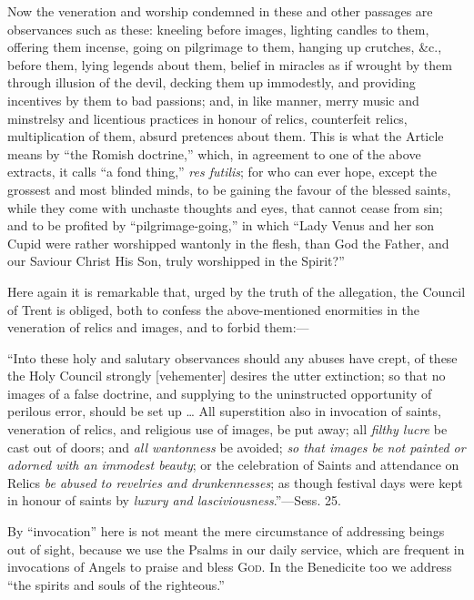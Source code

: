 Now the veneration and worship condemned in these and other
passages are observances such as these: kneeling before images,
lighting candles to them, offering them incense, going on pilgrimage
to them, hanging up crutches, \&c., before them, lying legends
about them, belief in miracles as if wrought by them through illusion
of the devil, decking them up immodestly, and providing incentives by
them to bad passions; and, in like manner, merry music and minstrelsy
and licentious practices in honour of relics, counterfeit relics,
multiplication of them, absurd pretences about them. This is what the
Article means by ``the Romish doctrine,'' which, in agreement
to one of the above extracts, it calls ``a fond thing,'' \emph{res
futilis}; for who can ever hope, except the grossest and most
blinded minds, to be gaining the favour of the blessed saints, while
they come with unchaste thoughts and eyes, that cannot cease from sin;
and to be profited by ``pilgrimage-going,'' in which
``Lady Venus and her son Cupid were rather worshipped wantonly in
the flesh, than God the Father, and our Saviour Christ His Son, truly
worshipped in the Spirit?''

Here again it is remarkable that, urged by the truth of the
allegation, the Council of Trent is obliged, both to confess the
above-mentioned enormities in the veneration of relics and images, and
to forbid them:—

``Into these holy and salutary observances
should any abuses have crept, of these the Holy Council strongly
[vehementer] desires the utter extinction; so that no images of a
false doctrine, and supplying to the uninstructed opportunity of
perilous error, should be set up … All superstition also in
invocation of saints, veneration of relics, and religious use of
images, be put away; all \emph{filthy lucre} be cast out of doors; and
\emph{all wantonness} be avoided; \emph{so that images be not painted or
adorned with an immodest beauty}; or the celebration of Saints and
attendance on Relics \emph{be abused to revelries and drunkennesses};
as though festival days were kept in honour of saints by \emph{luxury and
lasciviousness}.''—Sess. 25.


By ``invocation'' here is not meant the mere circumstance
of addressing beings out of sight, because we use the Psalms in our
daily service, which are frequent in invocations of Angels to praise
and bless G\textsc{od}. In the Benedicite too we address
``the spirits and souls of the righteous.''

